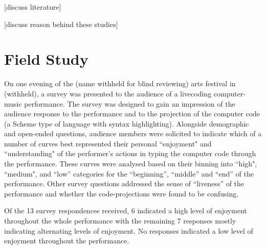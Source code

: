 \documentclass{sig-alternate}
\begin{document}
{\color{red}[discuss literature]}

{\color{red}[discuss reason behind these studies]}

\section{Field Study}


On one evening of the (name withheld for blind reviewing) arts festival in (withheld), 
a survey was presented to the audience of a livecoding computer-music performance. The survey was designed to gain an impression of the audience response to the performance and to the projection of the computer code (a Scheme type of language with syntax highlighting). Alongside demographic and open-ended questions, audience members were solicited to indicate which of a number of curves best represented their personal ``enjoyment" and ``understanding" of the performer's actions in typing the computer code through the performance. These curves were analysed based on their binning into ``high", ``medium", and ``low'' categories for the ``beginning'', ``middle'' and ``end'' of the performance. Other survey questions addressed the sense of ``liveness'' of the performance and whether the code-projections were found to be confusing. 




Of the 13 survey respondences received, 6 indicated a high level of enjoyment throughout the whole performance with the remaining 7 responses mostly indicating alternating levels of enjoyment. No responses indicated a low level of enjoyment throughout the performance.
\end{document}
